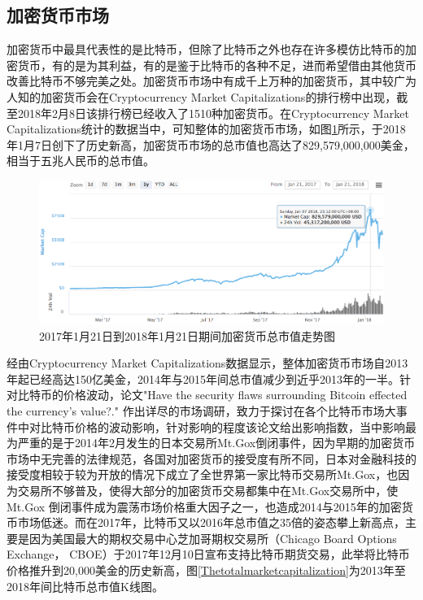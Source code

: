 		\subsection{加密货币市场}

		加密货币中最具代表性的是比特币，但除了比特币之外也存在许多模仿比特币的加密货币，有的是为其利益，有的是鉴于比特币的各种不足，进而希望借由其他货币改善⽐特币不够完美之处。加密货币市场中有成千上万种的加密货币，其中较广为人知的加密货币会在Cryptocurrency Market Capitalizations\supercite{CryptocurrencyMarketCapitalizations}的排行榜中出现，截至2018年2月8日该排行榜已经收入了1510种加密货币。在Cryptocurrency Market Capitalizations统计的数据当中，可知整体的加密货币市场，如图\ref{TotalMarketCapitalization}所示，于2018年1月7日创下了历史新高，加密货币市场的总市值也高达了829,579,000,000美金，相当于五兆人民币的总市值。

		\begin{figure}[!htb]
			\centering
			\includegraphics[width = 1\textwidth]{TotalMarketCapitalization.png}
			\caption{2017年1月21日到2018年1月21日期间加密货币总市值走势图\supercite{CryptocurrencyMarketCapitalizations}}\label{TotalMarketCapitalization}
		\end{figure}

		经由Cryptocurrency Market Capitalizations数据显示，整体加密货币市场自2013年起已经高达150亿美金，2014年与2015年间总市值减少到近乎2013年的一半。针对比特币的价格波动，论文"Have the security flaws surrounding Bitcoin effected the currency's value?."
		\supercite{HavethesecurityflawssurroundingBITCOINeffectedthecurrencysvalue?}
		作出详尽的市场调研，致力于探讨在各个比特币市场大事件中对比特币价格的波动影响，针对影响的程度该论文给出影响指数，当中影响最为严重的是于2014年2月发生的日本交易所Mt.Gox倒闭事件，因为早期的加密货币市场中无完善的法律规范，各国对加密货币的接受度有所不同，日本对金融科技的接受度相较于较为开放的情况下成立了全世界第一家比特币交易所Mt.Gox，也因为交易所不够普及，使得大部分的加密货币交易都集中在Mt.Gox交易所中，使Mt.Gox 倒闭事件成为震荡市场价格重⼤因⼦之⼀，也造成2014与2015年的加密货币市场低迷。而在2017年，比特币又以2016年总市值之35倍的姿态攀上新高点，主要是因为美国最大的期权交易中心芝加哥期权交易所（Chicago Board Options Exchange， CBOE）于2017年12月10日宣布支持比特币期货交易，此举将比特币价格推升到20,000美金的历史新高，图\ref{Thetotalmarketcapitalization}为2013年至2018年间比特币总市值K线图。


